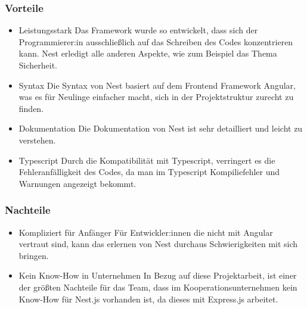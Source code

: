 \subsubsection{Vorteile}
\begin{itemize}
    \item Leistungsstark
    \newline
    Das Framework wurde so entwickelt, dass sich der Programmierer:in ausschließlich auf das Schreiben des Codes konzentrieren kann. Nest erledigt alle anderen Aspekte, wie zum Beispiel das Thema Sicherheit.
    \item Syntax
    \newline
    Die Syntax von Nest basiert auf dem Frontend Framework Angular, was es für Neulinge einfacher macht, sich in der Projektstruktur zurecht zu finden.
    \item Dokumentation
    \newline
    Die Dokumentation von Nest ist sehr detailliert und leicht zu verstehen.
    \item Typescript
    \newline
    Durch die Kompatibilität mit Typescript, verringert es die Fehleranfälligkeit des Codes, da man im Typescript Kompiliefehler und Warnungen angezeigt bekommt.
\end{itemize}

\subsubsection{Nachteile}
\begin{itemize}
    \item Kompliziert für Anfänger
    \newline
    Für Entwickler:innen die nicht mit Angular vertraut sind, kann das erlernen von Nest durchaus Schwierigkeiten mit sich bringen.
    \item Kein Know-How in Unternehmen
    \newline
    In Bezug auf diese Projektarbeit, ist einer der größten Nachteile für das Team, dass im Kooperationsunternehmen kein Know-How für Nest.js vorhanden ist, da dieses mit Express.js arbeitet.
\end{itemize}
\cite{Nest_js_Pros_Cons}
